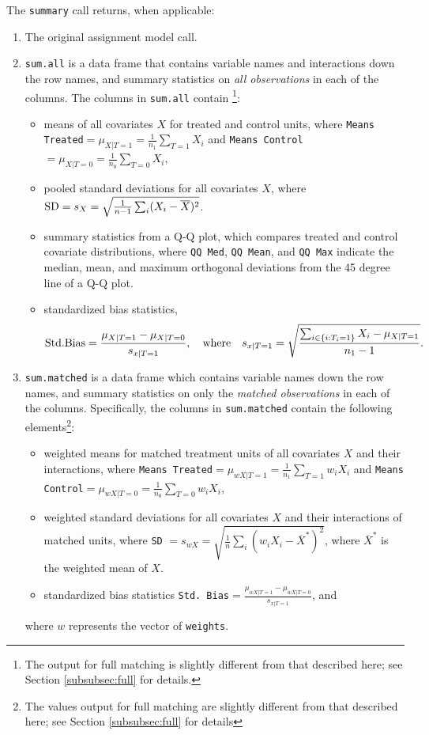 \documentclass[oneside,letterpaper,titlepage]{article}
\begin{document}
The \texttt{summary} call returns, when applicable:

\begin{enumerate}
\item The original assignment model call.
\item \texttt{sum.all} is a data frame that contains variable names
  and interactions down the row names, and summary statistics on
  \emph{all observations} in each of the columns.  The columns in
  \texttt{sum.all} contain \footnote{The output for full matching is
    slightly different from that described here; see Section
    \ref{subsubsec:full} for details.}:
  \begin{itemize}
  \item means of all covariates $X$ for treated and control units,
    where \texttt{Means Treated}$= \mu_{X|T=1} = \frac{1}{n_1}
    \sum_{T=1} X_i$ and \texttt{Means Control}$= \mu_{X|T=0} =
    \frac{1}{n_0} \sum_{T=0} X_i$,
  \item pooled standard deviations for all covariates $X$, where ${\rm
      SD} = s_X = \sqrt{\frac{1}{n-1} \sum_{i} (X_i -
      \overline{X})^2}$.
  \item summary statistics from a Q-Q plot, which compares treated and
    control covariate distributions, where \texttt{QQ Med}, \texttt{QQ
      Mean}, and \texttt{QQ Max} indicate the median, mean, and
    maximum orthogonal deviations from the 45 degree line of a Q-Q
    plot.
  \item standardized bias statistics, $${\rm Std.
      Bias}=\frac{\mu_{X|T=1} - \mu_{X|T=0}}{s_{x|T=1}}, \quad {\rm
      where} \quad s_{x|T=1} = \sqrt{\frac{\sum_{i \in \{i: T_i=1\}}
        X_i - \mu_{X|T=1}}{n_1-1} }.$$
  \end{itemize}
  
\item \texttt{sum.matched} is a data frame which contains variable
  names down the row names, and summary statistics on only the
  \emph{matched observations} in each of the columns.  Specifically,
  the columns in \texttt{sum.matched} contain the following
  elements\footnote{The values output for full matching are slightly
    different from that described here; see Section \ref{subsubsec:full}
    for details}:
  \begin{itemize}
  \item weighted means for matched treatment units of all covariates
    $X$ and their interactions, where \texttt{Means Treated}$=
    \mu_{wX|T=1} = \frac{1}{n_1} \sum_{T=1} w_iX_i$ and \texttt{Means
      Control}$=\mu_{wX|T=0} = \frac{1}{n_0} \sum_{T=0} w_iX_i$,
  \item weighted standard deviations for all covariates $X$ and their
    interactions of matched units, where \texttt{SD} $= s_{wX} =
    \sqrt{\frac{1}{n} \sum_{i} (w_iX_i - \overline{X}^*)^2}$, where
    $\overline{X}^*$ is the weighted mean of $X$.
  \item standardized bias statistics \texttt{Std.
      Bias}$=\frac{\mu_{wX|T=1} - \mu_{wX|T=0}}{s_{x|T=1}}$, and
  \end{itemize}
  where $w$ represents the vector of \texttt{weights}.
  

\end{enumerate}
\end{document}
